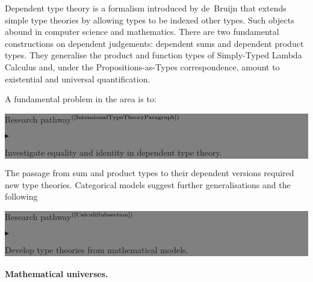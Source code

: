 \documentclass[11pt,twocolumn]{article}
\newenvironment{btritemize}
  {\begin{list}{\btr}
  {\setlength{\topsep}{2pt}
   \setlength{\partopsep}{2pt}
   \setlength{\itemsep}{2.5pt}
   \setlength{\parsep}{2.5pt}
   \setlength{\leftmargin}{1em}
   \setlength{\labelwidth}{.5em}}}
  {\end{list}}
\newcommand{\mysf}{\small\sf}
\newcommand{\mytextsf}[1]{\textsf{\small #1}}
\newcommand{\pref}[1]{\,(\ref{#1})}
\newcommand{\eg}{\emph{eg.}}
\newcommand{\btr}{$\blacktriangleright$}
\newcommand{\reqpsize}{8.113395cm}%
\newcommand{\rep}[2]{\begin{center}\colorbox{grey}{\begin{minipage}{\reqpsize}
  \mytextsf{Research pathway}\hfill$^{\mbox{\scriptsize #1 }}$\\[-5.5mm]
  \begin{btritemize}
  \item #2
  \end{btritemize}
\end{minipage}}\end{center}}
\begin{document}
Dependent type theory is a formalism introduced by
de~Bruijn %
that extends simple type theories by allowing types to be indexed 
other types.  Such objects abound in computer science and mathematics.  
There are two fundamental constructions on %
dependent judgements: %
dependent sums and dependent product types.  %
They generalise the product and function types of Simply-Typed Lambda
Calculus and, under the Propositions-as-Types correspondence, amount to
existential and universal quantification.  

A fundamental problem in the area is to:
\rep{(\ref{IntensionalTypeTheoryParagraph})}
  {Investigate equality and identity in dependent type theory.}

The passage from sum and product types to their dependent versions
required new type theories.  Categorical models suggest further
generalisations 
and the following %
\rep{(\ref{CalculiSubsection})}
  {Develop type theories from mathematical models.}

\paragraph{Mathematical universes.}
\label{MathematicalUniversesParagraph}
\end{document}
